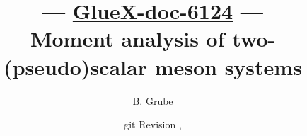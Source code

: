 \title{\textbf{--- \href{https://halldweb.jlab.org/doc-private/DocDB/ShowDocument?docid=6124}{GlueX-doc-6124} ---} \\
  Moment analysis of two-(pseudo)scalar meson systems}%

\date{\Large git Revision \texttt{\gitcommithash}, \gitcommitdate}%

\author[1]{B. Grube}%

%
